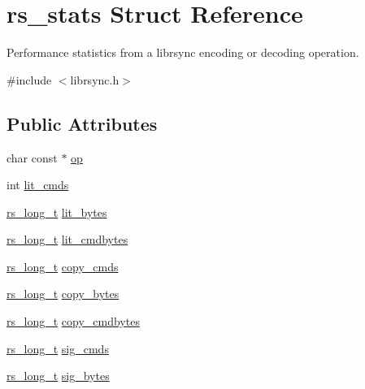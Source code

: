 \hypertarget{structrs__stats}{}\section{rs\+\_\+stats Struct Reference}
\label{structrs__stats}


Performance statistics from a librsync encoding or decoding operation.  




{\ttfamily \#include $<$librsync.\+h$>$}

\subsection*{Public Attributes}
\begin{DoxyCompactItemize}
\item 
char const $\ast$ \hyperlink{structrs__stats_a7bea565f5d1687eb6b953b518034d43c}{op}
\item 
int \hyperlink{structrs__stats_a0126775feaafac1539f519ac56346713}{lit\+\_\+cmds}
\item 
\hyperlink{librsync-config_8h_a6edddd44ca74c10ea65ef82d116e0ffa}{rs\+\_\+long\+\_\+t} \hyperlink{structrs__stats_af21a0846d6bafd18f6f592862808fac4}{lit\+\_\+bytes}
\item 
\hyperlink{librsync-config_8h_a6edddd44ca74c10ea65ef82d116e0ffa}{rs\+\_\+long\+\_\+t} \hyperlink{structrs__stats_a30dfcfe89000e028ca4054c8501879fc}{lit\+\_\+cmdbytes}
\item 
\hyperlink{librsync-config_8h_a6edddd44ca74c10ea65ef82d116e0ffa}{rs\+\_\+long\+\_\+t} \hyperlink{structrs__stats_a6ade0b71046b937d5caa10247842fe54}{copy\+\_\+cmds}
\item 
\hyperlink{librsync-config_8h_a6edddd44ca74c10ea65ef82d116e0ffa}{rs\+\_\+long\+\_\+t} \hyperlink{structrs__stats_a9b21056da59babbb2821136da124062d}{copy\+\_\+bytes}
\item 
\hyperlink{librsync-config_8h_a6edddd44ca74c10ea65ef82d116e0ffa}{rs\+\_\+long\+\_\+t} \hyperlink{structrs__stats_adff5dde5dffc6a43920ca6c7efb28ab7}{copy\+\_\+cmdbytes}
\item 
\hyperlink{librsync-config_8h_a6edddd44ca74c10ea65ef82d116e0ffa}{rs\+\_\+long\+\_\+t} \hyperlink{structrs__stats_ae0089977b2e626379ace74995402f771}{sig\+\_\+cmds}
\item 
\hyperlink{librsync-config_8h_a6edddd44ca74c10ea65ef82d116e0ffa}{rs\+\_\+long\+\_\+t} \hyperlink{structrs__stats_acc808480deca2206d1e619ae1915a3a2}{sig\+\_\+bytes}
\item 

\end{DoxyCompactItemize}
